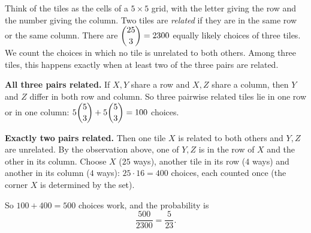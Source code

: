 Think of the tiles as the cells of a $5\times5$ grid, with the letter giving the row and the number giving the column. Two tiles are \emph{related} if they are in the same row or the same column. There are $\dbinom{25}{3}=2300$ equally likely choices of three tiles. We count the choices in which no tile is unrelated to both others. Among three tiles, this happens exactly when at least two of the three pairs are related.

\textbf{All three pairs related.} If $X,Y$ share a row and $X,Z$ share a column, then $Y$ and $Z$ differ in both row and column. So three pairwise related tiles lie in one row or in one column: $5\dbinom53+5\dbinom53=100$ choices.

\textbf{Exactly two pairs related.} Then one tile $X$ is related to both others and $Y,Z$ are unrelated. By the observation above, one of $Y,Z$ is in the row of $X$ and the other in its column. Choose $X$ ($25$ ways), another tile in its row ($4$ ways) and another in its column ($4$ ways): $25\cdot16=400$ choices, each counted once (the corner $X$ is determined by the set).

So $100+400=500$ choices work, and the probability is
\[\dfrac{500}{2300}=\boxed{\dfrac{5}{23}}.\]

